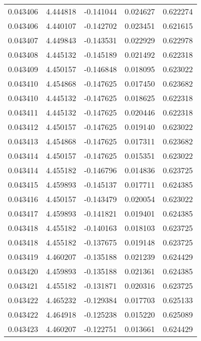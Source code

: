 \begin{tabular}{lrrrr}
0.043406    &  4.444818 & -0.141044 &  0.024627 &             0.622274 \\
0.043406    &  4.440107 & -0.142702 &  0.023451 &             0.621615 \\
0.043407    &  4.449843 & -0.143531 &  0.022929 &             0.622978 \\
0.043408    &  4.445132 & -0.145189 &  0.021492 &             0.622318 \\
0.043409    &  4.450157 & -0.146848 &  0.018095 &             0.623022 \\
0.043410    &  4.454868 & -0.147625 &  0.017450 &             0.623682 \\
0.043410    &  4.445132 & -0.147625 &  0.018625 &             0.622318 \\
0.043411    &  4.445132 & -0.147625 &  0.020446 &             0.622318 \\
0.043412    &  4.450157 & -0.147625 &  0.019140 &             0.623022 \\
0.043413    &  4.454868 & -0.147625 &  0.017311 &             0.623682 \\
0.043414    &  4.450157 & -0.147625 &  0.015351 &             0.623022 \\
0.043414    &  4.455182 & -0.146796 &  0.014836 &             0.623725 \\
0.043415    &  4.459893 & -0.145137 &  0.017711 &             0.624385 \\
0.043416    &  4.450157 & -0.143479 &  0.020054 &             0.623022 \\
0.043417    &  4.459893 & -0.141821 &  0.019401 &             0.624385 \\
0.043418    &  4.455182 & -0.140163 &  0.018103 &             0.623725 \\
0.043418    &  4.455182 & -0.137675 &  0.019148 &             0.623725 \\
0.043419    &  4.460207 & -0.135188 &  0.021239 &             0.624429 \\
0.043420    &  4.459893 & -0.135188 &  0.021361 &             0.624385 \\
0.043421    &  4.455182 & -0.131871 &  0.020316 &             0.623725 \\
0.043422    &  4.465232 & -0.129384 &  0.017703 &             0.625133 \\
0.043422    &  4.464918 & -0.125238 &  0.015220 &             0.625089 \\
0.043423    &  4.460207 & -0.122751 &  0.013661 &             0.624429 \\

\end{tabular}
